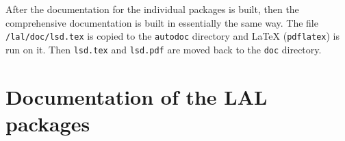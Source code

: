 \documentclass[oneside]{book}
\begin{document}
After the documentation for the individual packages is built, then the
comprehensive documentation is built in essentially the same way.  The
file {\tt /lal/doc/lsd.tex} is copied to the {\tt autodoc} directory
and {\LaTeX}  ({\tt pdflatex}) is run on it. Then  {\tt lsd.tex} and
{\tt lsd.pdf} are moved back to the {\tt doc} directory.



\part{Documentation of the LAL packages}














%












%



\backmatter

\printindex
\end{document}

